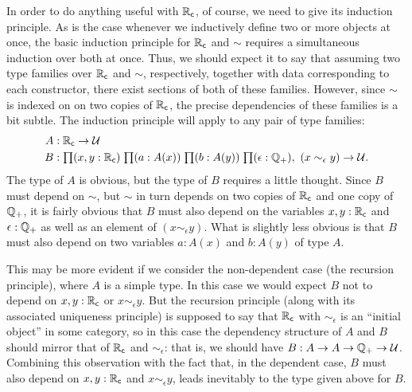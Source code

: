 In order to do anything useful with $\mathbb{R}_\mathsf{c}$, of course, we need to give its induction principle.
As is the case whenever we inductively define two or more objects at once, the basic induction principle for $\mathbb{R}_\mathsf{c}$ and $\mathord\sim$ requires a simultaneous induction over both at once.
Thus, we should expect it to say that assuming two type families over $\mathbb{R}_\mathsf{c}$ and $\sim$, respectively, together with data corresponding to each constructor, there exist sections of both of these families.
However, since $\sim$ is indexed on on two copies of $\mathbb{R}_\mathsf{c}$, the precise dependencies of these families is a bit subtle.
The induction principle will apply to any pair of type families:
\begin{align*}
A&:\RC\to\type\\
B&:\prd{x,y:\RC}{a:A(x)}{b:A(y)}{\epsilon:\Qp} (x\sim_\epsilon y) \to \type.
\end{align*}
The type of $A$ is obvious, but the type of $B$ requires a little thought.
Since $B$ must depend on $\sim$, but $\sim$ in turn depends on two copies of $\mathbb{R}_\mathsf{c}$ and one copy of $\mathbb{Q}_{+}$, it is fairly obvious that $B$ must also depend on the variables $x,y:\mathbb{R}_\mathsf{c}$ and $\epsilon:\mathbb{Q}_{+}$ as well as an element of $(x\sim_\epsilon y)$.
What is slightly less obvious is that $B$ must also depend on two variables $a:A(x)$ and $b:A(y)$ of type $A$.

This may be more evident if we consider the non-dependent case (the recursion principle), where $A$ is a simple type.
In this case we would expect $B$ not to depend on $x,y:\mathbb{R}_\mathsf{c}$ or $x\sim_\epsilon y$.
But the recursion principle (along with its associated uniqueness principle) is supposed to say that $\mathbb{R}_\mathsf{c}$ with $\sim_\epsilon$ is an ``initial object'' in some category, so in this case the dependency structure of $A$ and $B$ should mirror that of $\mathbb{R}_\mathsf{c}$ and $\sim_\epsilon$: that is, we should have $B:A\to A\to \mathbb{Q}_{+} \to \mathcal{U}$.
Combining this observation with the fact that, in the dependent case, $B$ must also depend on $x,y:\mathbb{R}_\mathsf{c}$ and $x\sim_\epsilon y$, leads inevitably to the type given above for $B$.

